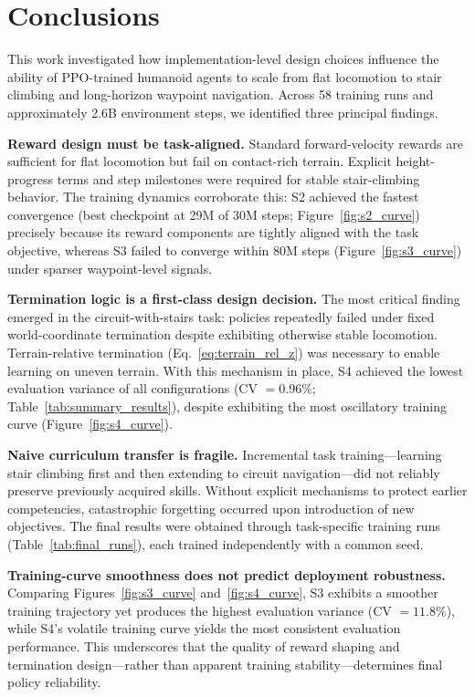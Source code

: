 \documentclass[conference]{IEEEtran}
\begin{document}
\section{Conclusions}
\label{sec:conclusion}

This work investigated how implementation-level design choices influence the ability of PPO-trained humanoid agents to scale from flat locomotion to stair climbing and long-horizon waypoint navigation.
Across 58 training runs and approximately 2.6B environment steps, we identified three principal findings.

\textbf{Reward design must be task-aligned.}
Standard forward-velocity rewards are sufficient for flat locomotion but fail on contact-rich terrain. Explicit height-progress terms and step milestones were required for stable stair-climbing behavior. The training dynamics corroborate this: S2 achieved the fastest convergence (best checkpoint at 29M of 30M steps; Figure~\ref{fig:s2_curve}) precisely because its reward components are tightly aligned with the task objective, whereas S3 failed to converge within 80M steps (Figure~\ref{fig:s3_curve}) under sparser waypoint-level signals.

\textbf{Termination logic is a first-class design decision.}
The most critical finding emerged in the circuit-with-stairs task: policies repeatedly failed under fixed world-coordinate termination despite exhibiting otherwise stable locomotion. Terrain-relative termination (Eq.~\ref{eq:terrain_rel_z}) was necessary to enable learning on uneven terrain. With this mechanism in place, S4 achieved the lowest evaluation variance of all configurations (CV $= 0.96\%$; Table~\ref{tab:summary_results}), despite exhibiting the most oscillatory training curve (Figure~\ref{fig:s4_curve}).

\textbf{Naive curriculum transfer is fragile.}
Incremental task training---learning stair climbing first and then extending to circuit navigation---did not reliably preserve previously acquired skills. Without explicit mechanisms to protect earlier competencies, catastrophic forgetting occurred upon introduction of new objectives. The final results were obtained through task-specific training runs (Table~\ref{tab:final_runs}), each trained independently with a common seed.

\textbf{Training-curve smoothness does not predict deployment robustness.}
Comparing Figures~\ref{fig:s3_curve} and~\ref{fig:s4_curve}, S3 exhibits a smoother training trajectory yet produces the highest evaluation variance (CV $= 11.8\%$), while S4's volatile training curve yields the most consistent evaluation performance. This underscores that the quality of reward shaping and termination design---rather than apparent training stability---determines final policy reliability.
\end{document}
